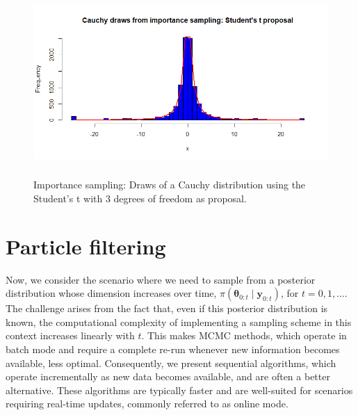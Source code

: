 \begin{figure}[!h]
	\includegraphics[width=340pt, height=200pt]{Chapters/chapter5/figures/IScauchyStudent.png}
	\caption[List of figure caption goes here]{Importance sampling: Draws of a Cauchy distribution using the Student's t with 3 degrees of freedom as proposal.}\label{fig57}
\end{figure}       

\section{Particle filtering}\label{sec53}

Now, we consider the scenario where we need to sample from a posterior distribution whose dimension increases over time, $\pi(\bm{\theta}_{0:t}\mid \bm{y}_{0:t})$, for $t = 0, 1, \dots$. The challenge arises from the fact that, even if this posterior distribution is known, the computational complexity of implementing a sampling scheme in this context increases linearly with $t$. This makes MCMC methods, which operate in batch mode and require a complete re-run whenever new information becomes available, less optimal. Consequently, we present sequential algorithms, which operate incrementally as new data becomes available, and are often a better alternative. These algorithms are typically faster and are well-suited for scenarios requiring real-time updates, commonly referred to as online mode.

